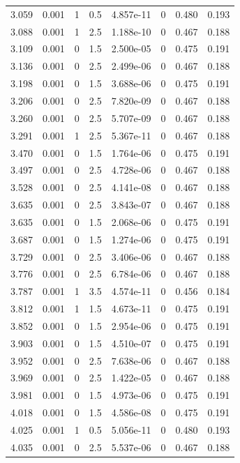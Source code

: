 \documentclass[preview]{standalone}
\begin{document}
{{{\begin{tabular}{L{1.2cm}C{1.2cm} C{0.3cm}C{0.5cm} C{1.4cm}C{1.4cm} C{1.4cm}C{1.4cm}}
  3.059  &  0.001  & 1     & 0.5 &  4.857e-11  & 0  & 0.480 &  0.193   \\ 
  3.088  &  0.001  & 1     & 2.5 &  1.188e-10  & 0  & 0.467 &  0.188   \\ 
  3.109  &  0.001  & 0     & 1.5 &  2.500e-05  & 0  & 0.475 &  0.191   \\ 
  3.136  &  0.001  & 0     & 2.5 &  2.499e-06  & 0  & 0.467 &  0.188   \\ 
  3.198  &  0.001  & 0     & 1.5 &  3.688e-06  & 0  & 0.475 &  0.191   \\ 
  3.206  &  0.001  & 0     & 2.5 &  7.820e-09  & 0  & 0.467 &  0.188   \\ 
  3.260  &  0.001  & 0     & 2.5 &  5.707e-09  & 0  & 0.467 &  0.188   \\ 
  3.291  &  0.001  & 1     & 2.5 &  5.367e-11  & 0  & 0.467 &  0.188   \\ 
  3.470  &  0.001  & 0     & 1.5 &  1.764e-06  & 0  & 0.475 &  0.191   \\ 
  3.497  &  0.001  & 0     & 2.5 &  4.728e-06  & 0  & 0.467 &  0.188   \\ 
  3.528  &  0.001  & 0     & 2.5 &  4.141e-08  & 0  & 0.467 &  0.188   \\ 
  3.635  &  0.001  & 0     & 2.5 &  3.843e-07  & 0  & 0.467 &  0.188   \\ 
  3.635  &  0.001  & 0     & 1.5 &  2.068e-06  & 0  & 0.475 &  0.191   \\ 
  3.687  &  0.001  & 0     & 1.5 &  1.274e-06  & 0  & 0.475 &  0.191   \\ 
  3.729  &  0.001  & 0     & 2.5 &  3.406e-06  & 0  & 0.467 &  0.188   \\ 
  3.776  &  0.001  & 0     & 2.5 &  6.784e-06  & 0  & 0.467 &  0.188   \\ 
  3.787  &  0.001  & 1     & 3.5 &  4.574e-11  & 0  & 0.456 &  0.184   \\ 
  3.812  &  0.001  & 1     & 1.5 &  4.673e-11  & 0  & 0.475 &  0.191   \\ 
  3.852  &  0.001  & 0     & 1.5 &  2.954e-06  & 0  & 0.475 &  0.191   \\ 
  3.903  &  0.001  & 0     & 1.5 &  4.510e-07  & 0  & 0.475 &  0.191   \\ 
  3.952  &  0.001  & 0     & 2.5 &  7.638e-06  & 0  & 0.467 &  0.188   \\ 
  3.969  &  0.001  & 0     & 2.5 &  1.422e-05  & 0  & 0.467 &  0.188   \\ 
  3.981  &  0.001  & 0     & 1.5 &  4.973e-06  & 0  & 0.475 &  0.191   \\ 
  4.018  &  0.001  & 0     & 1.5 &  4.586e-08  & 0  & 0.475 &  0.191   \\ 
  4.025  &  0.001  & 1     & 0.5 &  5.056e-11  & 0  & 0.480 &  0.193   \\ 
  4.035  &  0.001  & 0     & 2.5 &  5.537e-06  & 0  & 0.467 &  0.188   \\ 
\hline 
\end{tabular} 

}}}
\end{document}
